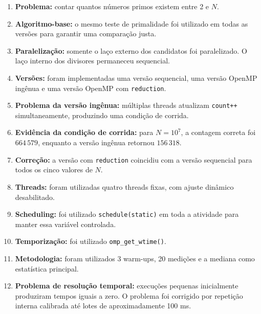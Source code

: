 \begin{enumerate}
    \item \textbf{Problema:}
    contar quantos números primos existem entre 2 e \(N\).

    \item \textbf{Algoritmo-base:}
    o mesmo teste de primalidade foi utilizado em todas as versões para
    garantir uma comparação justa.

    \item \textbf{Paralelização:}
    somente o laço externo dos candidatos foi paralelizado.
    O laço interno dos divisores permaneceu sequencial.

    \item \textbf{Versões:}
    foram implementadas uma versão sequencial, uma versão OpenMP ingênua e
    uma versão OpenMP com \texttt{reduction}.

    \item \textbf{Problema da versão ingênua:}
    múltiplas threads atualizam \texttt{count++} simultaneamente,
    produzindo uma condição de corrida.

    \item \textbf{Evidência da condição de corrida:}
    para \(N=10^7\), a contagem correta foi \(664\,579\), enquanto a versão
    ingênua retornou \(156\,318\).

    \item \textbf{Correção:}
    a versão com \texttt{reduction} coincidiu com a versão sequencial para
    todos os cinco valores de \(N\).

    \item \textbf{Threads:}
    foram utilizadas quatro threads fixas, com ajuste dinâmico desabilitado.

    \item \textbf{Scheduling:}
    foi utilizado \texttt{schedule(static)} em toda a atividade para manter
    essa variável controlada.

    \item \textbf{Temporização:}
    foi utilizado \texttt{omp\_get\_wtime()}.

    \item \textbf{Metodologia:}
    foram utilizados 3 warm-ups, 20 medições e a mediana como estatística
    principal.

    \item \textbf{Problema de resolução temporal:}
    execuções pequenas inicialmente produziram tempos iguais a zero.
    O problema foi corrigido por repetição interna calibrada até lotes de
    aproximadamente 100 ms.


\end{enumerate}
